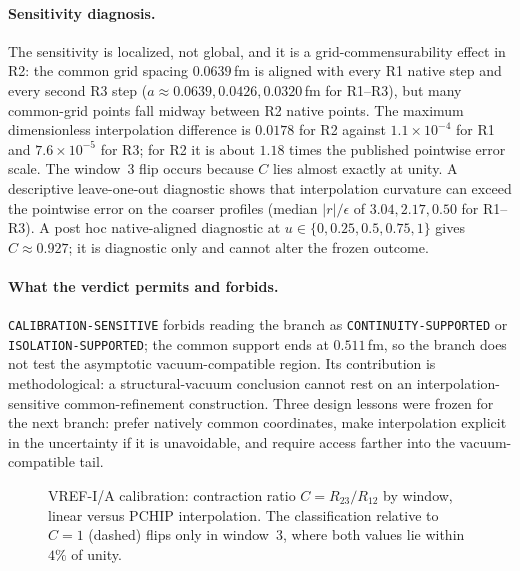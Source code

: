 \documentclass[11pt,a4paper]{article}
\theoremstyle{definition}
\theoremstyle{remark}
\begin{document}
\paragraph{Sensitivity diagnosis.} The sensitivity is localized, not global, and it is a grid-commensurability effect in R2: the common grid spacing $0.0639$\,fm is aligned with every R1 native step and every second R3 step ($a\approx0.0639,0.0426,0.0320$\,fm for R1--R3), but many common-grid points fall midway between R2 native points. The maximum dimensionless interpolation difference is $0.0178$ for R2 against $1.1\times10^{-4}$ for R1 and $7.6\times10^{-5}$ for R3; for R2 it is about $1.18$ times the published pointwise error scale. The window~3 flip occurs because $C$ lies almost exactly at unity. A descriptive leave-one-out diagnostic shows that interpolation curvature can exceed the pointwise error on the coarser profiles (median $|r|/\epsilon$ of $3.04,2.17,0.50$ for R1--R3). A post hoc native-aligned diagnostic at $u\in\{0,0.25,0.5,0.75,1\}$ gives $C\approx0.927$; it is diagnostic only and cannot alter the frozen outcome.
\paragraph{What the verdict permits and forbids.} \texttt{CALIBRATION-\allowbreak{}SENSITIVE} forbids reading the branch as \texttt{CONTINUITY-\allowbreak{}SUPPORTED} or \texttt{ISOLATION-\allowbreak{}SUPPORTED}; the common support ends at $0.511$\,fm, so the branch does not test the asymptotic vacuum-compatible region. Its contribution is methodological: a structural-vacuum conclusion cannot rest on an interpolation-sensitive common-refinement construction. Three design lessons were frozen for the next branch: prefer natively common coordinates, make interpolation explicit in the uncertainty if it is unavoidable, and require access farther into the vacuum-compatible tail.

\begin{figure}[t]
\centering
{}
\caption{VREF-I/A calibration: contraction ratio $C=R_{23}/R_{12}$ by window, linear versus PCHIP interpolation. The classification relative to $C=1$ (dashed) flips only in window~3, where both values lie within $4\%$ of unity.}\label{fig:baker}
\end{figure}
\end{document}

